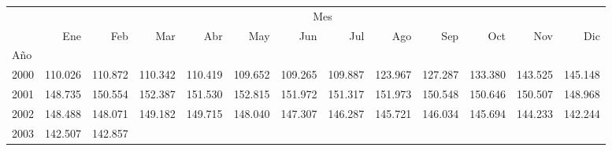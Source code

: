 \begin{tabular}{lllllllllllll}
\cline{1-13}
\multicolumn{1}{c}{} &
  \multicolumn{12}{|c}{Mes} \\
\multicolumn{1}{c}{} &
  \multicolumn{1}{|r}{Ene} &
  \multicolumn{1}{r}{Feb} &
  \multicolumn{1}{r}{Mar} &
  \multicolumn{1}{r}{Abr} &
  \multicolumn{1}{r}{May} &
  \multicolumn{1}{r}{Jun} &
  \multicolumn{1}{r}{Jul} &
  \multicolumn{1}{r}{Ago} &
  \multicolumn{1}{r}{Sep} &
  \multicolumn{1}{r}{Oct} &
  \multicolumn{1}{r}{Nov} &
  \multicolumn{1}{r}{Dic} \\
\cline{1-13}
\multicolumn{1}{l}{Año} &
  \multicolumn{1}{|r}{} &
  \multicolumn{1}{r}{} &
  \multicolumn{1}{r}{} &
  \multicolumn{1}{r}{} &
  \multicolumn{1}{r}{} &
  \multicolumn{1}{r}{} &
  \multicolumn{1}{r}{} &
  \multicolumn{1}{r}{} &
  \multicolumn{1}{r}{} &
  \multicolumn{1}{r}{} &
  \multicolumn{1}{r}{} &
  \multicolumn{1}{r}{} \\
\multicolumn{1}{l}{\hspace{1em}2000} &
  \multicolumn{1}{|r}{110.026} &
  \multicolumn{1}{r}{110.872} &
  \multicolumn{1}{r}{110.342} &
  \multicolumn{1}{r}{110.419} &
  \multicolumn{1}{r}{109.652} &
  \multicolumn{1}{r}{109.265} &
  \multicolumn{1}{r}{109.887} &
  \multicolumn{1}{r}{123.967} &
  \multicolumn{1}{r}{127.287} &
  \multicolumn{1}{r}{133.380} &
  \multicolumn{1}{r}{143.525} &
  \multicolumn{1}{r}{145.148} \\
\multicolumn{1}{l}{\hspace{1em}2001} &
  \multicolumn{1}{|r}{148.735} &
  \multicolumn{1}{r}{150.554} &
  \multicolumn{1}{r}{152.387} &
  \multicolumn{1}{r}{151.530} &
  \multicolumn{1}{r}{152.815} &
  \multicolumn{1}{r}{151.972} &
  \multicolumn{1}{r}{151.317} &
  \multicolumn{1}{r}{151.973} &
  \multicolumn{1}{r}{150.548} &
  \multicolumn{1}{r}{150.646} &
  \multicolumn{1}{r}{150.507} &
  \multicolumn{1}{r}{148.968} \\
\multicolumn{1}{l}{\hspace{1em}2002} &
  \multicolumn{1}{|r}{148.488} &
  \multicolumn{1}{r}{148.071} &
  \multicolumn{1}{r}{149.182} &
  \multicolumn{1}{r}{149.715} &
  \multicolumn{1}{r}{148.040} &
  \multicolumn{1}{r}{147.307} &
  \multicolumn{1}{r}{146.287} &
  \multicolumn{1}{r}{145.721} &
  \multicolumn{1}{r}{146.034} &
  \multicolumn{1}{r}{145.694} &
  \multicolumn{1}{r}{144.233} &
  \multicolumn{1}{r}{142.244} \\
\multicolumn{1}{l}{\hspace{1em}2003} &
  \multicolumn{1}{|r}{142.507} &
  \multicolumn{1}{r}{142.857} &

\end{tabular}
